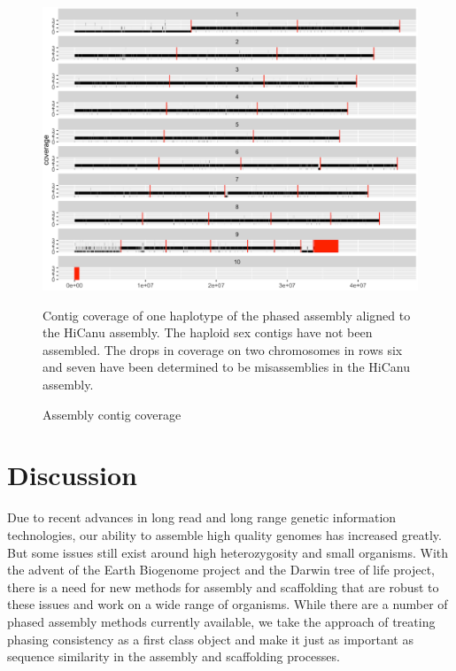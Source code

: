{\begin{figure}[htbp!]
\caption{Assembly contig coverage}
\label{figure:contigcoverage}
\begin{centering}
\includegraphics[width=\textwidth]{assemblycontigcoverage.png}
\par{Contig coverage of one haplotype of the phased assembly aligned to the HiCanu assembly. The haploid sex contigs have not been assembled. The drops in coverage on two chromosomes in rows six and seven have been determined to be misassemblies in the HiCanu assembly. }
\end{centering}
\end{figure}



\section{Discussion}

\par{
Due to recent advances in long read and long range genetic information technologies, our ability to assemble high quality genomes has increased greatly. But some issues still exist around high heterozygosity and small organisms. With the advent of the Earth Biogenome project and the Darwin tree of life project, there is a need for new methods for assembly and scaffolding that are robust to these issues and work on a wide range of organisms. While there are a number of phased assembly methods currently available, we take the approach of treating phasing consistency as a first class object and make it just as important as sequence similarity in the assembly and scaffolding processes.
} \\

}
